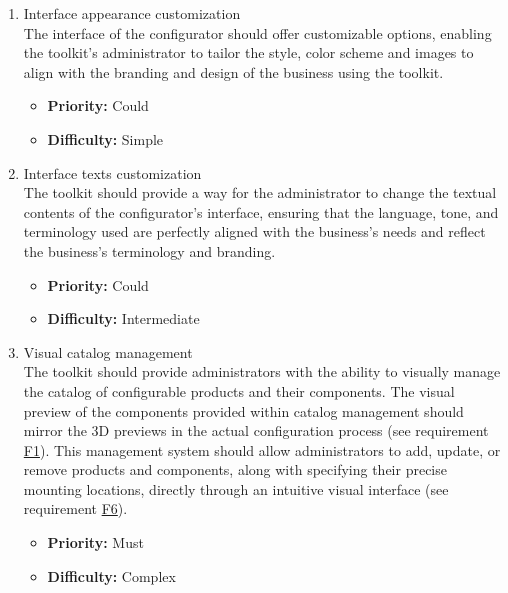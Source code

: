 \begin{enumerate}[label=\textbf{F\arabic*:}, leftmargin=*]
\item \label{itm:F14} Interface appearance customization
\vspace{2pt}
\\The interface of the configurator should offer customizable options, enabling the toolkit's administrator to tailor the style, color scheme and images to align with the branding and design of the business using the toolkit.
\begin{itemize}[noitemsep, label=\trianglebullet]
    \item \textbf{Priority:} Could
    \item \textbf{Difficulty:} Simple
\end{itemize}
\vspace{4pt}

\item \label{itm:F15} Interface texts customization
\vspace{2pt}
\\The toolkit should provide a way for the administrator to change the textual contents of the configurator's interface, ensuring that the language, tone, and terminology used are perfectly aligned with the business's needs and reflect the business's terminology and branding.
\begin{itemize}[noitemsep, label=\trianglebullet]
    \item \textbf{Priority:} Could
    \item \textbf{Difficulty:} Intermediate
\end{itemize}
\vspace{4pt}

\item \label{itm:F16} Visual catalog management
\vspace{2pt}
\\The toolkit should provide administrators with the ability to visually manage the catalog of configurable products and their components. The visual preview of the components provided within catalog management should mirror the 3D previews in the actual configuration process (see requirement \hyperref[itm:F1]{F1}). This management system should allow administrators to add, update, or remove products and components, along with specifying their precise mounting locations, directly through an intuitive visual interface (see requirement \hyperref[itm:F6]{F6}).
\begin{itemize}[noitemsep, label=\trianglebullet]
    \item \textbf{Priority:} Must
    \item \textbf{Difficulty:} Complex
\end{itemize}
\vspace{4pt}


\end{enumerate}
